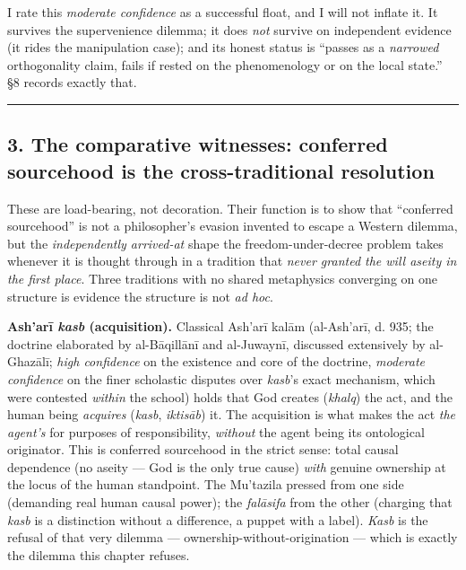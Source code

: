 \documentclass[11pt]{article}
\begin{document}
I rate this \emph{moderate confidence} as a successful float, and I will not inflate it. It survives the supervenience dilemma; it does \emph{not} survive on independent evidence (it rides the manipulation case); and its honest status is ``passes as a \emph{narrowed} orthogonality claim, fails if rested on the phenomenology or on the local state.'' §8 records exactly that.

\medskip\noindent\rule{\linewidth}{0.3pt}\medskip

\subsection*{3. The comparative witnesses: conferred sourcehood is the cross-traditional resolution}

These are load-bearing, not decoration. Their function is to show that ``conferred sourcehood'' is not a philosopher's evasion invented to escape a Western dilemma, but the \emph{independently arrived-at} shape the freedom-under-decree problem takes whenever it is thought through in a tradition that \emph{never granted the will aseity in the first place}. Three traditions with no shared metaphysics converging on one structure is evidence the structure is not \emph{ad hoc}.

\textbf{Ash'arī \emph{kasb} (acquisition).} Classical Ash'arī kalām (al-Ash'arī, d. 935; the doctrine elaborated by al-Bāqillānī and al-Juwaynī, discussed extensively by al-Ghazālī; \emph{high confidence} on the existence and core of the doctrine, \emph{moderate confidence} on the finer scholastic disputes over \emph{kasb}'s exact mechanism, which were contested \emph{within} the school) holds that God creates (\emph{khalq}) the act, and the human being \emph{acquires} (\emph{kasb}, \emph{iktisāb}) it. The acquisition is what makes the act \emph{the agent's} for purposes of responsibility, \emph{without} the agent being its ontological originator. This is conferred sourcehood in the strict sense: total causal dependence (no aseity — God is the only true cause) \emph{with} genuine ownership at the locus of the human standpoint. The Mu'tazila pressed from one side (demanding real human causal power); the \emph{falāsifa} from the other (charging that \emph{kasb} is a distinction without a difference, a puppet with a label). \emph{Kasb} is the refusal of that very dilemma — ownership-without-origination — which is exactly the dilemma this chapter refuses.
\end{document}
